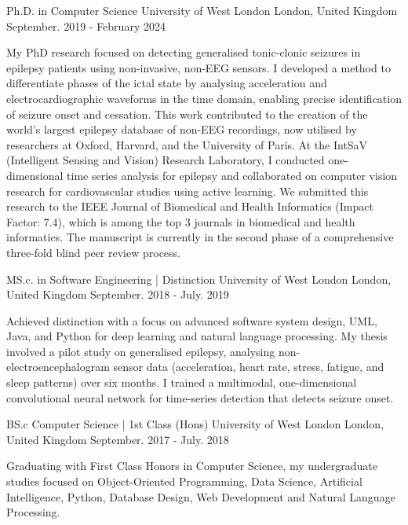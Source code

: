 
\begin{cventries}

  \cventry
    {Ph.D. in Computer Science} %
    {University of West London} %
    {London, United Kingdom} %
    {September. 2019 - February 2024} %
    {
\begin{cvitems} %
  \item {My PhD research focused on detecting generalised tonic-clonic seizures in epilepsy patients using non-invasive, non-EEG sensors. I developed a method to differentiate phases of the ictal state by analysing acceleration and electrocardiographic waveforms in the time domain, enabling precise identification of seizure onset and cessation. This work contributed to the creation of the world’s largest epilepsy database of non-EEG recordings, now utilised by researchers at Oxford, Harvard, and the University of Paris. At the IntSaV (Intelligent Sensing and Vision) Research Laboratory, I conducted one-dimensional time series analysis for epilepsy and collaborated on computer vision research for cardiovascular studies using active learning. We submitted this research to the IEEE Journal of Biomedical and Health Informatics (Impact Factor: 7.4), which is among the top 3 journals in biomedical and health informatics. The manuscript is currently in the second phase of a comprehensive three-fold blind peer review process.}
\end{cvitems}
}

  \cventry
    {MS.c. in Software Engineering | Distinction} %
    {University of West London} %
    {London, United Kingdom} %
    {September. 2018 - July. 2019} %
    {
    \begin{cvitems} %
      \item {Achieved distinction with a focus on advanced software system design, UML, Java, and Python for deep learning and natural language processing. My thesis involved a pilot study on generalised epilepsy, analysing non-electroencephalogram sensor data (acceleration, heart rate, stress, fatigue, and sleep patterns) over six months. I trained a multimodal, one-dimensional convolutional neural network for time-series detection that detects seizure onset.}
    \end{cvitems}
    }
  \cventry
    {BS.c Computer Science | 1st Class (Hons)}  %
    {University of West London} %
    {London, United Kingdom} %
    {September. 2017 - July. 2018} %
    {
    \begin{cvitems} %
      \item {Graduating with First Class Honors in Computer Science, my undergraduate studies focused on Object-Oriented Programming, Data Science, Artificial Intelligence, Python, Database Design, Web Development and Natural Language Processing.}
    \end{cvitems}
    }

\end{cventries}

